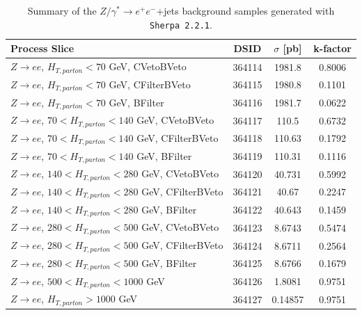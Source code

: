 \begin{table}[htbp]
\centering
\scriptsize
\begin{tabularx}{400pt}{|X||c|c|c|}
\hline
\centering \textbf{Process Slice} & \textbf{DSID} & \textbf{$\sigma$ [pb]} & \textbf{k-factor}\\
\hline
$Z\rightarrow ee$, $H_{T,parton} < 70$ GeV, CVetoBVeto & 364114 & 1981.8 & 0.8006 \\ \hline
$Z\rightarrow ee$, $H_{T,parton} < 70$ GeV, CFilterBVeto & 364115 & 1980.8 & 0.1101 \\ \hline
$Z\rightarrow ee$, $H_{T,parton} < 70$ GeV, BFilter & 364116 & 1981.7 & 0.0622 \\ \hline
$Z\rightarrow ee$, $70 < H_{T,parton} < 140$ GeV, CVetoBVeto & 364117 & 110.5 & 0.6732 \\ \hline
$Z\rightarrow ee$, $70 < H_{T,parton} < 140$ GeV, CFilterBVeto & 364118 & 110.63 & 0.1792 \\ \hline
$Z\rightarrow ee$, $70 < H_{T,parton} < 140$ GeV, BFilter & 364119 & 110.31 & 0.1116 \\ \hline
$Z\rightarrow ee$, $140 < H_{T,parton} < 280$ GeV, CVetoBVeto & 364120 & 40.731 & 0.5992 \\ \hline
$Z\rightarrow ee$, $140 < H_{T,parton} < 280$ GeV, CFilterBVeto & 364121 & 40.67 & 0.2247 \\ \hline
$Z\rightarrow ee$, $140 < H_{T,parton} < 280$ GeV, BFilter & 364122 & 40.643 & 0.1459 \\ \hline
$Z\rightarrow ee$, $280 < H_{T,parton} < 500$ GeV, CVetoBVeto & 364123 & 8.6743 & 0.5474 \\ \hline
$Z\rightarrow ee$, $280 < H_{T,parton} < 500$ GeV, CFilterBVeto & 364124 & 8.6711 & 0.2564 \\ \hline
$Z\rightarrow ee$, $280 < H_{T,parton} < 500$ GeV, BFilter & 364125 & 8.6766 & 0.1679 \\ \hline
$Z\rightarrow ee$, $500 < H_{T,parton} < 1000$ GeV & 364126 & 1.8081 & 0.9751 \\ \hline
$Z\rightarrow ee$, $H_{T,parton} > 1000$ GeV & 364127 & 0.14857 & 0.9751 \\ \hline
\end{tabularx}
\caption{\rm Summary of the $Z/\gamma^* \to e^+e^-$+jets background samples generated with \texttt{Sherpa~2.2.1}.}
\label{tab:ZjetsSamplesSherpa1}
\end{table}


